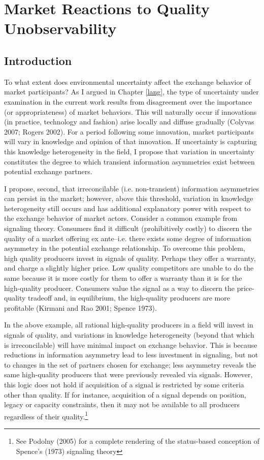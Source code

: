 \chapter{Market Reactions to Quality Unobservability \label{signal}}


\section{Introduction}

To what extent does environmental uncertainty affect the exchange behavior of market participants?  As I argued in Chapter \ref{lang}, the type of uncertainty under examination in the current work results from disagreement over the importance (or appropriateness) of market behaviors. This will naturally occur if innovations (in practice, technology and fashion) arise locally and diffuse gradually (Colyvas 2007; Rogers 2002). For a period following some innovation, market participants will vary in knowledge and opinion of that innovation. If uncertainty is capturing this knowledge heterogeneity in the field, I propose that variation in uncertainty constitutes the degree to which transient information asymmetries exist between potential exchange partners. 

I propose, second, that irreconcilable (i.e. non-transient) information asymmetries can persist in the market; however, above this threshold, variation in knowledge heterogeneity still occurs and has additional explanatory power with respect to the exchange behavior of market actors. Consider a common example from signaling theory. Consumers find it difficult (prohibitively costly) to discern the quality of a market offering ex ante--i.e. there exists some degree of information asymmetry in the potential exchange relationship. To overcome this problem, high quality producers invest in signals of quality. Perhaps they offer a warranty, and charge a slightly higher price. Low quality competitors are unable to do the same because it is more costly for them to offer a warranty than it is for the high-quality producer. Consumers value the signal as a way to discern the price-quality tradeoff and, in equilibrium, the high-quality producers are more profitable (Kirmani and Rao 2001; Spence 1973).

In the above example, all rational high-quality producers in a field will invest in signals of quality, and variations in knowledge heterogeneity (beyond that which is irreconcilable) will have minimal impact on exchange behavior. This is because reductions in information asymmetry lead to less investment in signaling, but not to changes in the set of partners chosen for exchange; less asymmetry reveals the same high-quality producers that were previously revealed via signals. However, this logic does not hold if acquisition of a signal is restricted by some criteria other than quality. If for instance, acquisition of a signal depends on position, legacy or capacity constraints, then it may not be available to all producers regardless of their quality.\footnote{See Podolny (2005) for a complete rendering of the status-based conception of Spence's (1973) signaling theory} 

